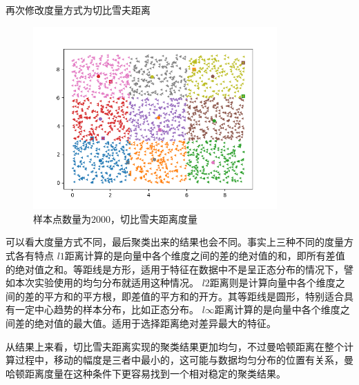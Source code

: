 \documentclass{article}
\begin{document}
再次修改度量方式为切比雪夫距离
\begin{figure}[H]
    \centering
    \begin{minipage}[t]{1.0\linewidth}
        \centering
        \includegraphics[height=7cm]{Figure_3.png}
        \caption{样本点数量为$2000$，切比雪夫距离度量}
    \end{minipage}
 \end{figure}
 可以看大度量方式不同，最后聚类出来的结果也会不同。事实上三种不同的度量方式各有特点
 $l1$距离计算的是向量中各个维度之间的差的绝对值的和，即所有差值的绝对值之和。等距线是方形，适用于特征在数据中不是呈正态分布的情况下，譬如本次实验使用的均匀分布就适用这种情况。
$l2$距离则是计算向量中各个维度之间的差的平方和的平方根，即差值的平方和的开方。其等距线是圆形，特别适合具有一定中心趋势的样本分布，比如正态分布。
$l\infty$距离计算的是向量中各个维度之间差的绝对值的最大值。适用于选择距离绝对差异最大的特征。

从结果上来看，切比雪夫距离实现的聚类结果更加均匀，不过曼哈顿距离在整个计算过程中，移动的幅度是三者中最小的，这可能与数据均匀分布的位置有关系，曼哈顿距离度量在这种条件下更容易找到一个相对稳定的聚类结果。
\end{document}
